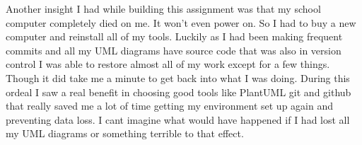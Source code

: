 \documentclass[12pt]{article}
\begin{document}
Another insight I had while building this assignment was that my school computer completely died on me. It won't even power on. So I had to buy a new computer and reinstall all of my tools. Luckily as I had been making frequent commits and all my
UML diagrams have source code that was also in version control I was able to restore almost all of my work except for a few things.
Though it did take me a minute to get back into what I was doing. During this ordeal I saw a real benefit in choosing good tools like PlantUML git and github
that really saved me a lot of time getting my environment set up again and preventing data loss.
I cant imagine what would have happened if I had lost all my UML diagrams or something terrible to that effect.
\end{document}
